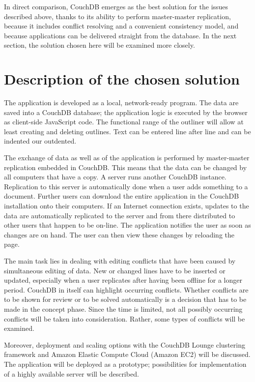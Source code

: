 In direct comparison, CouchDB emerges as the best solution for the issues described above, thanks to its ability to perform master-master replication, because it includes conflict resolving and a convenient consistency model, and because applications can be delivered straight from the database. In the next section, the solution chosen here will be examined more closely.

\section{Description of the chosen solution}

The application is developed as a local, network-ready program. The data are saved into a CouchDB database; the application logic is executed by the browser as client-side JavaScript code. The functional range of the outliner will allow at least creating and deleting outlines. Text can be entered line after line and can be indented our outdented.

The exchange of data as well as of the application is performed by master-master replication embedded in CouchDB. This means that the data can be changed by all computers that have a copy. A server runs another CouchDB instance. Replication to this server is automatically done when a user adds something to a document. Further users can download the entire application in the CouchDB installation onto their computers. If an Internet connection exists, updates to the data are automatically replicated to the server and from there distributed to other users that happen to be on-line. The application notifies the user as soon as changes are on hand. The user can then view these changes by reloading the page.

The main task lies in dealing with editing conflicts that have been caused by simultaneous editing of data. New or changed lines have to be inserted or updated, especially when a user replicates after having been offline for a longer period. CouchDB in itself can highlight occurring conflicts. Whether conflicts are to be shown for review or to be solved automatically is a decision that has to be made in the concept phase. Since the time is limited, not all possibly occurring conflicts will be taken into consideration. Rather, some types of conflicts will be examined.

Moreover, deployment and scaling options with the CouchDB Lounge clustering framework and Amazon Elastic Compute Cloud (Amazon EC2) will be discussed. The application will be deployed as a prototype; possibilities for implementation of a highly available server will be described.